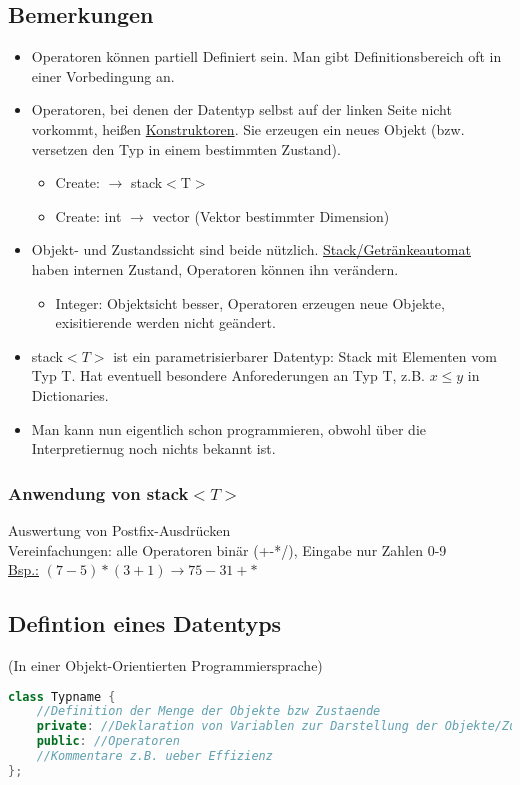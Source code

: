 \documentclass[a4paper]{article}
\begin{document}
\subsection{Bemerkungen}
\begin{itemize}
\item Operatoren können partiell Definiert sein. Man gibt Definitionsbereich oft in einer Vorbedingung an.
\item Operatoren, bei denen der Datentyp selbst auf der linken Seite nicht vorkommt, heißen \underline{Konstruktoren}. Sie erzeugen ein neues Objekt (bzw. versetzen den Typ in einem bestimmten Zustand).
	\begin{itemize}
		\item Create: $\rightarrow$ stack$<$T$>$
		\item Create: int $\rightarrow$ vector (Vektor bestimmter Dimension)
	\end{itemize}
\item Objekt- und Zustandssicht sind beide nützlich. \underline{Stack/Getränkeautomat} haben internen Zustand, Operatoren können ihn verändern.
	\begin{itemize}
		\item Integer: Objektsicht besser, Operatoren erzeugen neue Objekte, exisitierende werden nicht geändert.
	\end{itemize}
\item stack$<T>$ ist ein parametrisierbarer Datentyp: Stack mit Elementen vom Typ T. Hat eventuell besondere Anforederungen an Typ T, z.B. $x\leq y$ in Dictionaries.
\item Man kann nun eigentlich schon programmieren, obwohl über die Interpretiernug noch nichts bekannt ist.

\end{itemize}
\subsubsection*{Anwendung von stack$<T>$}
Auswertung von Postfix-Ausdrücken\\
Vereinfachungen: alle Operatoren binär (+-*/), Eingabe nur Zahlen 0-9\\
\underline{Bsp.:} $(7-5)*(3+1)\rightarrow 75-31+*$
\subsection{Defintion eines Datentyps}
(In einer Objekt-Orientierten Programmiersprache)\\
\begin{lstlisting}[language=c++]
class Typname {
	//Definition der Menge der Objekte bzw Zustaende
	private: //Deklaration von Variablen zur Darstellung der Objekte/Zustaende
	public: //Operatoren
	//Kommentare z.B. ueber Effizienz
};
\end{lstlisting}
\end{document}
